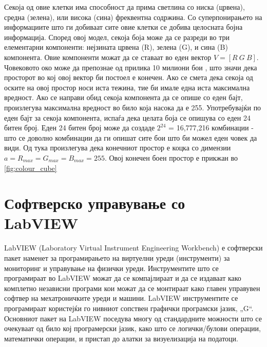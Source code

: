 \documentclass[11pt]{article}
\begin{document}
    Секоја од овие клетки има способност да прима светлина со ниска (црвена), средна (зелена), или висока (сина) фреквентна содржина. Со суперпонирањето на информациите што ги добиваат сите овие клетки се добива целосната бојна информација. Според овој модел, секоја боја може да се разреди во три елементарни компоненти: нејзината црвена (R), зелена (G), и сина (B) компонента. Овие компоненти можат да се ставаат во еден вектор $ V = [R\ G\ B]$. Човековото око може да препознае од прилика 10 милиони бои \cite{nColours}, што значи дека просторот во кој овој вектор би постоел е конечен. Ако се смета дека секоја од оските на овој простор носи иста тежина, тие би имале една иста максимална вредност. Ако се направи обид секоја компонента да се опише со еден бајт, произлегува максимална вредност во било која насока да е 255. Употребувајќи по еден бајт за секоја компонента, испаѓа дека целата боја се опишува со еден 24 битен број. Еден 24 битен број може да создаде $2^{24}$ = 16,777,216 комбинации - што се доволно комбинации да ги опишат сите бои што би можел еден човек да види. Од тука произлегува дека конечниот простор е коцка со димензии $a = R_{max} = G_{max} = B_{max} = 255 $.
    Овој конечен боен простор е прикжан во \ref{fig:colour_cube}
    \bigbreak


\newpage

\section{Софтверско управување со LabVIEW}
  LabVIEW (Laboratory Virtual Instrument Engineering Workbench) е софтверски пакет наменет за програмирањето на виртуелни уреди (инструменти) за мониторинг и управување на физички уреди. Инструментите што се програмираат во LabVIEW можат да се компајлираат и да се издаваат како комплетно независни програми кои можат да се монтираат како главен управувен софтвер на мехатроничките уреди и машини. LabVIEW инструментите се програмираат користејќи го нивниот сопствен графички програмски јазик, „G“.
  \\
  Основниот пакет на LabVIEW поседува многу од стандардните можности што се очекуваат од било кој програмерски јазик, како што се логички/булови операции, математички операции, и пристап до алатки за визуелизација на податоци.
\end{document}
